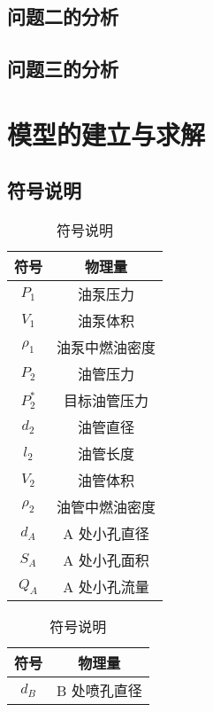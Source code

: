 \documentclass{cumcmthesis}
\begin{document}
\subsection{问题二的分析}
\subsection{问题三的分析}
\newpage


\section{模型的建立与求解}
\subsection{符号说明}
\begin{table}[!ht]
	\begin{minipage}{\textwidth}
		\begin{minipage}[t]{0.5\textwidth}
			\centering
			\caption{符号说明}
			\begin{tabular}{cc}
			        \toprule
			符号             & 物理量           \\
			\midrule
			$P_1$          & 油泵压力          \\
			$V_1$          & 油泵体积          \\
			$\rho_1$       & 油泵中燃油密度       \\
			$P_2$          & 油管压力          \\
			$P_2^*$        & 目标油管压力        \\
			$d_2$          & 油管直径          \\
			$l_2$          & 油管长度          \\
			$V_2$          & 油管体积          \\
			$\rho_2$       & 油管中燃油密度       \\
			$d_A$          & A 处小孔直径       \\
			$S_A$          & A 处小孔面积       \\
			$Q_A$          & A 处小孔流量       \\ \bottomrule
		\end{tabular}
	\end{minipage}
\begin{minipage}[t]{0.5\textwidth}
\centering
\caption{符号说明}
\begin{tabular}{cc}
\toprule
符号             & 物理量           \\
\midrule
$d_B$          & B 处喷孔直径       \\

\end{tabular}
\end{minipage}
\end{minipage}
\end{table}
\end{document}

